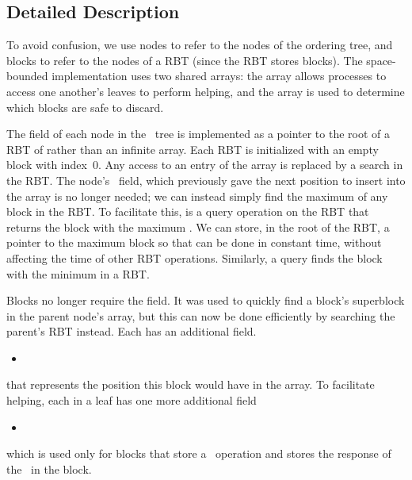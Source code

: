 
\subsection{Detailed Description}
\label{reducing-details}


\renewcommand{\algorithmiccomment}[1]{\hfill\eqparbox{COMMENTSINGLEAPP}{\com\ #1}}

To avoid confusion, we use nodes to refer to the nodes of the ordering tree, and blocks to refer
to the nodes of a RBT (since the RBT stores blocks).
The space-bounded implementation uses two  shared arrays:
the  array allows processes to access one another's leaves to perform helping, and
the  array is used to determine which blocks are safe to discard.

The  field of each node in the \ordering\ tree is implemented as a pointer to the root of a RBT of  rather than an infinite array.  
Each RBT is initialized with an empty block with index~0.
Any access to an entry of the  array is replaced by a search in the RBT.
The node's \head\ field, which previously gave the next position to insert into the  array is no
longer needed; we can instead simply find the maximum  of any block in the RBT.
To facilitate this,  is a query operation on the RBT that 
returns the block with the maximum .
We can store, in the root of the RBT, a pointer to the maximum block so that 
can be done in constant time, without affecting the time of other RBT operations.
Similarly, a  query finds the block with the minimum  in a RBT.

Blocks no longer require the  field.  It was used to quickly find a block's 
superblock in the parent node's  array, but this can now be done efficiently 
by searching the parent's  RBT instead.
Each  has an additional field.
\begin{itemize}
\item {}  
\end{itemize}
that represents the position this block would have in the  array.
To facilitate helping, each  in a leaf has one more additional field 
\begin{itemize}
\item {} 
\end{itemize}
which is used only for blocks that store a \dequeue\ operation and stores the response of the \dequeue\ in the block.


